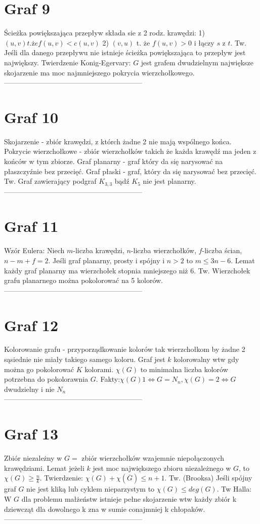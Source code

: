 \documentclass{article}
\begin{document}
\begin{minipage}[t]{.33\textwidth}
\section*{Graf 9}
Ścieżka powiększająca przepływ składa sie z 2 rodz. krawędzi: 1) $(u,v) t. że f(u,v) < c(u,v)$ 2) $(v,u)$ t. że $f(u,v) > 0$ i łączy $s$ z $t$. Tw. Jeśli dla danego przepływu nie istnieje ścieżka powiększająca to przepływ jest największy. Twierdzenie Konig-Egervary: $G$ jest grafem dwudzielnym największe skojarzenie ma moc najmniejszego pokrycia wierzchołkowego.
\\-----------------------------------------------------------
\section*{Graf 10}
Skojarzenie - zbiór krawędzi, z którch żadne 2 nie mają wspólnego końca.
Pokrycie wierzchołkowe - zbiór wierzchołków takich że każda krawędź ma jeden z końców w tym zbiorze. Graf planarny - graf który da się narysować na płaszczyźnie bez przecięć. Graf płaski - graf, który da się narysować bez przecięć. Tw. Graf zawierający podgraf $K_{3,3}$ bądź $K_{5}$ nie jest planarny.
\\-----------------------------------------------------------
\section*{Graf 11}
Wzór Eulera: Niech $m$-liczba krawędzi, $n$-liczba wierzchołków, $f$-liczba ścian, $n-m+f=2$. Jeśli graf planarny, prosty i spójny i $n>2$ to $m \leq 3n-6$. Lemat każdy graf planarny ma wierzchołek stopnia mniejszego niż 6. Tw. Wierzchołek grafu planarnego można pokolorować na 5 kolorów.  
\\-----------------------------------------------------------
\section*{Graf 12}
Kolorowanie grafu - przyporządkowanie kolorów tak wierzchołkom by żadne 2 sąsiednie nie miały takiego samego koloru. Graf jest $k$ kolorowalny wtw gdy można go pokolorować $K$ kolorami. $\chi(G)$ to minimalna liczba kolorów potrzebna do pokolorawnia $G$.
Fakty:$\chi(G) 1 \iff G = N_n, \chi(G) = 2 \iff G$ dwudzielny i nie $N_n$
\\-----------------------------------------------------------
\section*{Graf 13}
Zbiór niezależny w $G =$ zbiór wierzchołków wzajemnie niepołączonych krawędziami. Lemat jeżeli $k$ jest moc największego zbioru niezależnego w $G$, to $\chi(G) \geq \frac{n}{k}$. Twierdzenie: $\chi(G) + \chi(\overline{G}) \leq n+1$. Tw. (Brooksa) Jeśli spójny graf $G$ nie jest kliką lub cyklem nieparzystym to $\chi(G) \leq deg(G)$. Tw Halla: W $G$ dla problemu małżeństw istnieje pełne skojarzenie wtw każdy zbiór k dziewcząt dla dowolnego k zna w sumie conajmniej k chłopaków.
\\-----------------------------------------------------------
\end{minipage}
\end{document}
